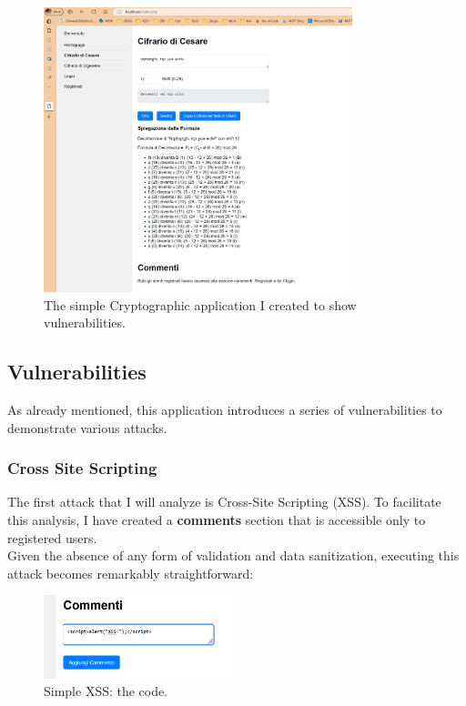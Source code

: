 \documentclass{article}
\begin{document}
\begin{figure}[h]
\centering
\includegraphics[width=0.8\textwidth]{images/1.png}
\caption{The simple Cryptographic application I created to show vulnerabilities.}
\label{fig:site}
\end{figure}

\subsection{Vulnerabilities}
As already mentioned, this application introduces a series of vulnerabilities to demonstrate various attacks.

\subsubsection{Cross Site Scripting}
The first attack that I will analyze is Cross-Site Scripting (XSS). To facilitate this analysis, I have created a \textbf{comments} section that is accessible only to registered users.
\\
Given the absence of any form of validation and data sanitization, executing this attack becomes remarkably straightforward:

\begin{figure}[h]
\centering
\includegraphics[width=0.5\textwidth]{images/5.png}
\caption{Simple XSS: the code.}
\label{fig:xss1}
\end{figure}
\end{document}
